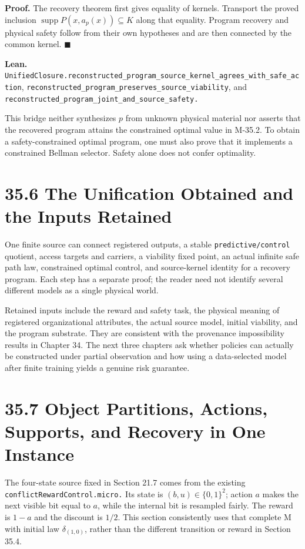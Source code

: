\documentclass[
  english,
  11pt,
  oneside]{book}
\begin{document}
\textbf{Proof.} The recovery theorem first gives equality of kernels. Transport the proved inclusion \(\operatorname{supp}P(x,a_p(x))\subseteq K\) along that equality. Program recovery and physical safety follow from their own hypotheses and are then connected by the common kernel. \(\blacksquare\)

\textbf{Lean.} \nolinkurl{UnifiedClosure.reconstructed_program_source_kernel_agrees_with_safe_action}, \nolinkurl{reconstructed_program_preserves_source_viability}, and \nolinkurl{reconstructed_program_joint_and_source_safety.}

This bridge neither synthesizes \(p\) from unknown physical material nor asserts that the recovered program attains the constrained optimal value in M-35.2. To obtain a safety-constrained optimal program, one must also prove that it implements a constrained Bellman selector. Safety alone does not confer optimality.

\section{35.6 The Unification Obtained and the Inputs Retained}\label{the-unification-obtained-and-the-inputs-retained}

One finite source can connect registered outputs, a stable \nolinkurl{predictive/control} quotient, access targets and carriers, a viability fixed point, an actual infinite safe path law, constrained optimal control, and source-kernel identity for a recovery program. Each step has a separate proof; the reader need not identify several different models as a single physical world.

Retained inputs include the reward and safety task, the physical meaning of registered organizational attributes, the actual source model, initial viability, and the program substrate. They are consistent with the provenance impossibility results in Chapter 34. The next three chapters ask whether policies can actually be constructed under partial observation and how using a data-selected model after finite training yields a genuine risk guarantee.

\section{35.7 Object Partitions, Actions, Supports, and Recovery in One Instance}\label{object-partitions-actions-supports-and-recovery-in-one-instance}

The four-state source fixed in Section 21.7 comes from the existing \nolinkurl{conflictRewardControl.micro.} Its state is \((b,u)\in\{0,1\}^2\); action \(a\) makes the next visible bit equal to \(a\), while the internal bit is resampled fairly. The reward is \(1-a\) and the discount is \(1/2\). This section consistently uses that complete M with initial law \(\delta_{(1,0)}\), rather than the different transition or reward in Section 35.4.
\end{document}
